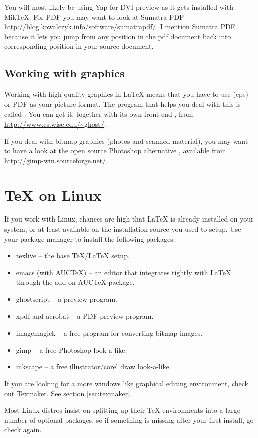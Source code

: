 You will most likely be using Yap for DVI preview as it gets installed with
MikTeX. For PDF you may want to look at Sumatra
PDF \url{http://blog.kowalczyk.info/software/sumatrapdf/}. I mention Sumatra PDF
because it lets you jump from any position in the pdf document back into
corresponding position in your source document.

\subsection{Working with graphics}

Working with high quality graphics in \LaTeX{} means that you have to use
\EPSi{} (eps) or PDF as your picture format. The program that helps you
deal with this is called . You can get it, together with its
own front-end , from \url{http://www.cs.wisc.edu/~ghost/}.

If you deal with bitmap graphics (photos and scanned material), you may want
to have a look at the open source Photoshop alternative , available
from \url{http://gimp-win.sourceforge.net/}.

\section{\TeX{} on Linux}

If you work with Linux, chances are high that \LaTeX{} is already installed
on your system, or at least available on the installation source you used to
setup. Use your package manager to install the following packages:

\begin{itemize}
\item texlive -- the base \TeX{}/\LaTeX{} setup.
\item emacs (with AUCTeX) -- an editor that integrates tightly with \LaTeX{} through the add-on AUCTeX package.
\item ghostscript -- a \PSi{} preview program.
\item xpdf and acrobat -- a PDF preview program.
\item imagemagick -- a free program for converting bitmap images.
\item gimp -- a free Photoshop look-a-like.
\item inkscape -- a free illustrator/corel draw look-a-like.
\end{itemize}

If you are looking for a more windows like graphical editing environment,
check out Texmaker. See section \ref{sec:texmaker}.

Most Linux distros insist on splitting up their \TeX{} environments into a
large number of optional packages, so if something is missing after your
first install, go check again.
